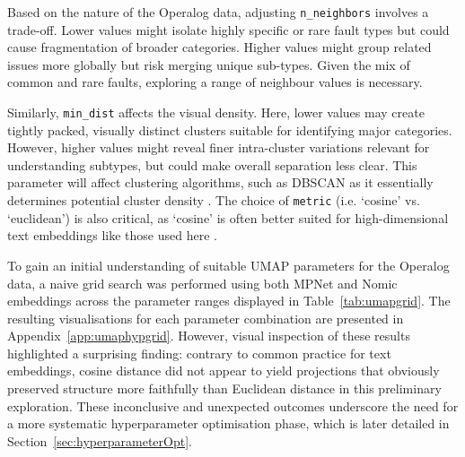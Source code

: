 \documentclass[10pt,oneside]{report}
\begin{document}
Based on the nature of the Operalog data, adjusting \texttt{n\_neighbors} involves a trade-off. Lower values might isolate highly specific or rare fault types but could cause fragmentation of broader categories. Higher values might group related issues more globally but risk merging unique sub-types. Given the mix of common and rare faults, exploring a range of neighbour values is necessary. 

Similarly, \texttt{min\_dist} affects the visual density. Here, lower values may create tightly packed, visually distinct clusters suitable for identifying major categories. However, higher values might reveal finer intra-cluster variations relevant for understanding subtypes, but could make overall separation less clear. This parameter will affect clustering algorithms, such as DBSCAN as it essentially determines potential cluster density \cite{ester1996density}.
The choice of \texttt{metric} (i.e. `cosine' vs. `euclidean') is also critical, as `cosine' is often better suited for high-dimensional text embeddings like those used here \cite{baba2017plagiarism, cao2024recent}.

To gain an initial understanding of suitable UMAP parameters for the Operalog data, a naive grid search was performed using both MPNet and Nomic embeddings across the parameter ranges displayed in Table~\ref{tab:umapgrid}. The resulting visualisations for each parameter combination are presented in Appendix~\ref{app:umaphypgrid}. However, visual inspection of these results highlighted a surprising finding: contrary to common practice for text embeddings, cosine distance did not appear to yield projections that obviously preserved structure more faithfully than Euclidean distance in this preliminary exploration. These inconclusive and unexpected outcomes underscore the need for a more systematic hyperparameter optimisation phase, which is later detailed in Section~\ref{sec:hyperparameterOpt}.
\end{document}
